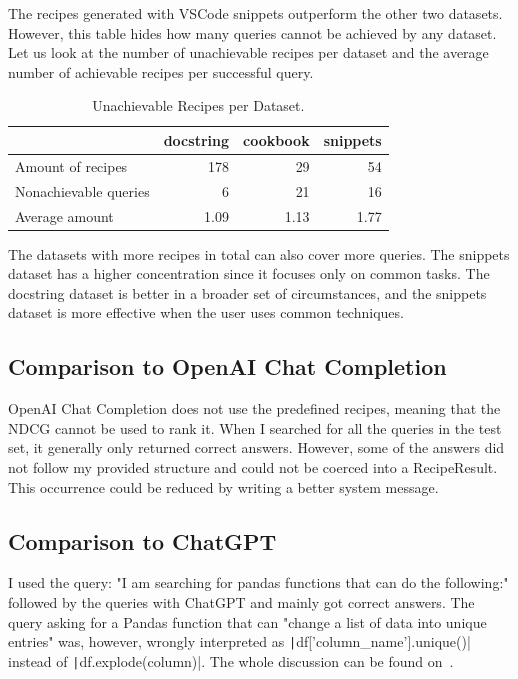 \documentclass[
     12pt,                    %
     a4paper,             %
     BCOR=10mm,     %
     DIV=14,                 %
     listof=totoc,                    %
     bibliography=totoc,       %
     index=totoc,              %
     twoside,
     headsepline
     ]{scrreprt}
\begin{document}
The recipes generated with VSCode snippets outperform the other two datasets. However, this table hides how many queries cannot be achieved by any dataset. Let us look at the number of unachievable recipes per dataset and the average number of achievable recipes per successful query.

\begin{table}[htb]
	\centering
	\begin{tabular}{lrrr}
		\toprule
		                      & docstring & cookbook & snippets \\ \midrule
		Amount of recipes     &       178 &       29 &       54 \\
		Nonachievable queries &         6 &       21 &       16 \\
		Average amount        &      1.09 &     1.13 &     1.77 \\ \bottomrule
	\end{tabular}
	\caption[Unachievable Recipes per Dataset]{Unachievable Recipes per Dataset.}
\end{table}

The datasets with more recipes in total can also cover more queries. The snippets dataset has a higher concentration since it focuses only on common tasks. The docstring dataset is better in a broader set of circumstances, and the snippets dataset is more effective when the user uses common techniques.

\subsection{Comparison to OpenAI Chat Completion}

OpenAI Chat Completion does not use the predefined recipes, meaning that the NDCG cannot be used to rank it. When I searched for all the queries in the test set, it generally only returned correct answers. However, some of the answers did not follow my provided structure and could not be coerced into a RecipeResult. This occurrence could be reduced by writing a better system message.

\subsection{Comparison to ChatGPT}

I used the query: "I am searching for pandas functions that can do the following:" followed by the queries with ChatGPT and mainly got correct answers. The query asking for a Pandas function that can "change a list of data into unique entries" was, however, wrongly interpreted as \texttt|df['column_name'].unique()| instead of \texttt|df.explode(column)|. The whole discussion can be found on~\cite{gptchat}.
\end{document}
